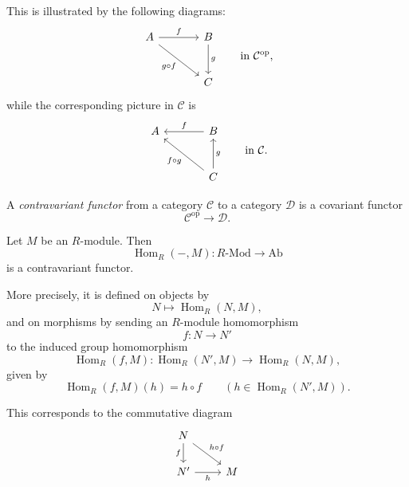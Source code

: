 This is illustrated by the following diagrams:
\[
    \begin{tikzcd}[column sep=large,row sep=large]
        A \arrow[r,"f"] \arrow[dr,"g\circ f"']& B \arrow[d,"g"] \\
        & C
    \end{tikzcd}
    \qquad\text{in } \mathcal C^{\mathrm{op}},
\]
while the corresponding picture in $\mathcal C$ is
\[
    \begin{tikzcd}[column sep=large,row sep=large]
        A & B \arrow[l,"f"'] \\
        & C \arrow[ul,"f\circ g"] \arrow[u,"g"']
    \end{tikzcd}
    \qquad\text{in } \mathcal C.
\]

\begin{definition}
    A \emph{contravariant functor} from a category $\mathcal C$ to a category $\mathcal D$ is a covariant functor
    \[
        \mathcal C^{\mathrm{op}} \to \mathcal D.
    \]
\end{definition}

\begin{example}
    Let $M$ be an $R$-module. Then
    \[
        \operatorname{Hom}_R(-,M): R\text{-}\mathrm{Mod} \to \mathrm{Ab}
    \]
    is a contravariant functor.
\end{example}

More precisely, it is defined on objects by
\[
    N \longmapsto \operatorname{Hom}_R(N,M),
\]
and on morphisms by sending an $R$-module homomorphism
\[
    f:N \to N'
\]
to the induced group homomorphism
\[
    \operatorname{Hom}_R(f,M): \operatorname{Hom}_R(N',M) \to \operatorname{Hom}_R(N,M),
\]
given by
\[
    \operatorname{Hom}_R(f,M)(h)=h\circ f
    \qquad
    (h\in \operatorname{Hom}_R(N',M)).
\]

This corresponds to the commutative diagram
\[
    \begin{tikzcd}
        N \arrow[d,"f"'] \arrow[dr,"h\circ f"] & \\
        N' \arrow[r,"h"'] & M
    \end{tikzcd}
\]

